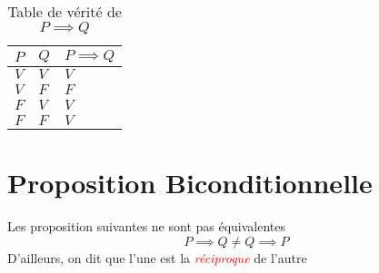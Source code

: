 \documentclass[16pt]{report}
\begin{document}
\begin{multicols*}{2}
            \begin{table}[H]
            \caption {Table de vérité de $P \implies Q$}
                  \begin{center}
                   \renewcommand{\arraystretch}{1.5}
                   \selectfont
                    \normalsize
                        \begin{tabular}{|l|l||l|}
                        \arrayrulecolor{blue}\hline
                        \rowcolor{lightBlue}
                        \textcolor{myb}{$P$} & \textcolor{myb}{$Q$} & \textcolor{myb}{$P \implies Q$}   
                        \\
                        \hline
                        \hline
                        \arrayrulecolor{black}
                        $V$ & $V$ & \cellcolor{myg} $V$
                        \\
                        \hline
                        $V$ & $F$ & \cellcolor{myr} $F$ 
                        \\
                        \hline
                        $F$ & $V$ & \cellcolor{myg} $V$ 
                        \\
                        \hline 
                        $F$ & $F$ & \cellcolor{myg} $V$ 
                        \\ 
                        \hline
                        \end{tabular}
                \end{center}
            \end{table}

            \section{Proposition Biconditionnelle}
            \begin{note}{}{}
                Les proposition suivantes ne sont pas équivalentes 
                \[ P \implies  Q  \neq Q \implies P \]  
                D'ailleurs, on dit que l'une est la \textcolor{red}{\textit{réciproque}} de l'autre     
            \end{note} 
            


\end{multicols*}
\end{document}

